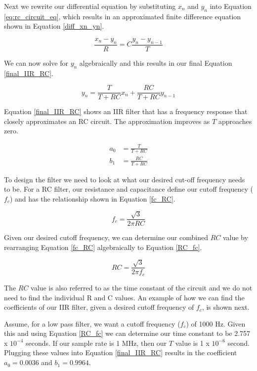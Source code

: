 Next we rewrite our differential equation by substituting $x_n$ and $y_n$ into Equation \ref{eq:rc_circuit_eq}, which results in an approximated finite difference equation shown in Equation \ref{diff_xn_yn}.

\begin{equation}\label{diff_xn_yn}
\frac{x_n-y_n}{R}=C\frac{y_n-y_{n-1}}{T}
\end{equation}

We can now solve for $y_n$ algebraically and this results in our final Equation \ref{final_IIR_RC}.

\begin{equation}\label{final_IIR_RC}
y_n=\frac{T}{T+RC}x_n+\frac{RC}{T+RC}y_{n-1}
\end{equation}

Equation \ref{final_IIR_RC} shows an IIR filter that has a frequency response that closely approximates an RC circuit.  The approximation improves as $T$ approaches zero.

\begin{align}
a_0 &= \frac{T}{T+RC} \\
b_1 &= \frac{RC}{T+RC}
\end{align}


To design the filter we need to look at what our desired cut-off frequency needs to be.  For a RC filter, our resistance and capacitance define our cutoff frequency ($f_c$) and has the relationship shown in Equation \ref{fc_RC}.

\begin{equation}\label{fc_RC}
f_c=\frac{\sqrt{3}}{2\pi RC}
\end{equation}

Given our desired cutoff frequency, we can determine our combined $RC$ value by rearranging Equation \ref{fc_RC} algebraically to Equation \ref{RC_fc}.

\begin{equation}\label{RC_fc}
RC=\frac{\sqrt{3}}{2\pi f_c}
\end{equation}

The $RC$ value is also referred to as the time constant of the circuit and we do not need to find the individual R and C values.  An example of how we can find the coefficients of our IIR filter, given a desired cutoff frequency of $f_c$, is shown next.  

Assume, for a low pass filter, we want a cutoff frequency ($f_c$) of 1000 Hz.  Given this and using Equation \ref{RC_fc} we can determine our time constant to be 2.757 x $10^{-4}$ seconds.  If our sample rate is 1 MHz, then our $T$ value is 1 x $10^{-6}$ second.  Plugging these values into Equation \ref{final_IIR_RC} results in the coefficient $a_0 = 0.0036$ and $b_1=0.9964$.



